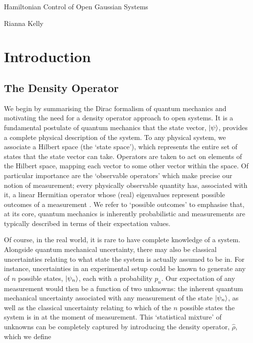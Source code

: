 \documentclass[11pt,a4paper,openbib]{article}
\numberwithin{equation}{section}
\begin{document}
\begin{center}
\LARGE{Hamiltonian Control of Open Gaussian Systems}

\large{Rianna Kelly}
\end{center}

\begin{abstract}

\end{abstract}

\section{Introduction}


\subsection{The Density Operator}
\label{sec:densityop}
We begin by summarising the Dirac formalism of quantum mechanics and motivating the need for a density operator approach to open systems. It is a fundamental postulate of quantum mechanics that the state vector, $\ket{\psi}$, provides a complete physical description of the system.  To any physical system, we associate a Hilbert space (the `state space'), which represents the entire set of states that the state vector can take. Operators are taken to act on elements of the Hilbert space, mapping each vector to some other vector within the space. Of particular importance are the `observable operators' which make precise our notion of measurement; every physically observable quantity has, associated with it, a linear Hermitian operator whose (real) eigenvalues represent possible outcomes of a measurement \cite{vonNeumann55}. We refer to `possible outcomes' to emphasise that, at its core, quantum mechanics is inherently probabilistic and measurements are typically described in terms of their expectation values.

Of course, in the real world, it is rare to have complete knowledge of a system. Alongside quantum mechanical uncertainty, there may also be classical uncertainties relating to what state the system is actually assumed to be in. For instance, uncertainties in an experimental setup could be known to generate any of $n$ possible states, $\ket{\psi_n}$, each with a probability $p_n$. Our expectation of any measurement would then be a function of two unknowns: the inherent quantum mechanical uncertainty associated with any measurement of the state $\ket{\psi_n}$, as well as the classical uncertainty relating to which of the $n$ possible states the system is in at the moment of measurement. This `statistical mixture' of unknowns can be completely captured by introducing the density operator, $\hat{\rho}$, which we define \cite{Fano57}
\end{document}
